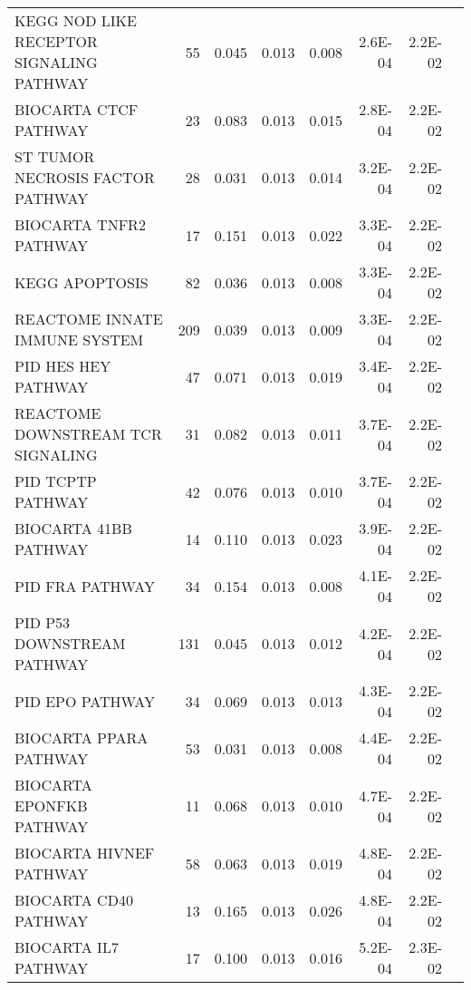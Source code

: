 \begin{table}[!ht]
{\begin{tabular}{p{3in}rrrrrrr}
			KEGG NOD LIKE RECEPTOR SIGNALING PATHWAY & 55 & 0.045 & 0.013 & 0.008 & 2.6E-04 & 
			2.2E-02 &  \\ 
			BIOCARTA CTCF PATHWAY & 23 & 0.083 & 0.013 & 0.015 & 2.8E-04 & 2.2E-02 &  \\ 
			ST TUMOR NECROSIS FACTOR PATHWAY & 28 & 0.031 & 0.013 & 0.014 & 3.2E-04 & 2.2E-02 &  \\ 
			BIOCARTA TNFR2 PATHWAY & 17 & 0.151 & 0.013 & 0.022 & 3.3E-04 & 2.2E-02 &  \\ 
			KEGG APOPTOSIS & 82 & 0.036 & 0.013 & 0.008 & 3.3E-04 & 2.2E-02 &  \\ 
			REACTOME INNATE IMMUNE SYSTEM & 209 & 0.039 & 0.013 & 0.009 & 3.3E-04 & 2.2E-02 &  \\ 
			PID HES HEY PATHWAY & 47 & 0.071 & 0.013 & 0.019 & 3.4E-04 & 2.2E-02 &  \\ 
			REACTOME DOWNSTREAM TCR SIGNALING & 31 & 0.082 & 0.013 & 0.011 & 3.7E-04 & 2.2E-02 &  
			\\ 
			PID TCPTP PATHWAY & 42 & 0.076 & 0.013 & 0.010 & 3.7E-04 & 2.2E-02 &  \\ 
			BIOCARTA 41BB PATHWAY & 14 & 0.110 & 0.013 & 0.023 & 3.9E-04 & 2.2E-02 &  \\ 
			PID FRA PATHWAY & 34 & 0.154 & 0.013 & 0.008 & 4.1E-04 & 2.2E-02 &  \\ 
			PID P53 DOWNSTREAM PATHWAY & 131 & 0.045 & 0.013 & 0.012 & 4.2E-04 & 2.2E-02 &  \\ 
			PID EPO PATHWAY & 34 & 0.069 & 0.013 & 0.013 & 4.3E-04 & 2.2E-02 &  \\ 
			BIOCARTA PPARA PATHWAY & 53 & 0.031 & 0.013 & 0.008 & 4.4E-04 & 2.2E-02 &  \\ 
			BIOCARTA EPONFKB PATHWAY & 11 & 0.068 & 0.013 & 0.010 & 4.7E-04 & 2.2E-02 &  \\ 
			BIOCARTA HIVNEF PATHWAY & 58 & 0.063 & 0.013 & 0.019 & 4.8E-04 & 2.2E-02 &  \\ 
			BIOCARTA CD40 PATHWAY & 13 & 0.165 & 0.013 & 0.026 & 4.8E-04 & 2.2E-02 &  \\ 
			BIOCARTA IL7 PATHWAY & 17 & 0.100 & 0.013 & 0.016 & 5.2E-04 & 2.3E-02 &  \\ 
			\hline
		\end{tabular}
	}
		\label{table:top30}
	\end{table}

	
	
	
	
